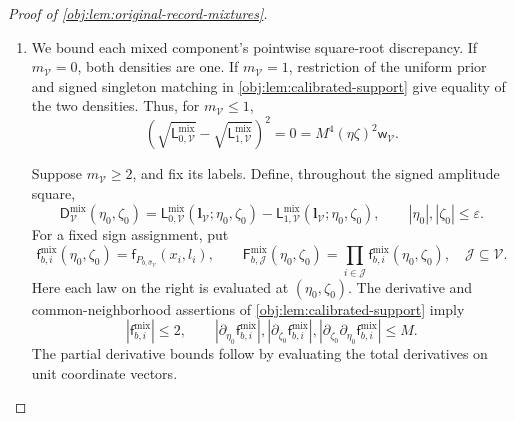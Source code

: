 \begin{proof}[Proof of \cref{obj:lem:original-record-mixtures}]
\begin{enumerate}
Define the conditional discrepancy by
\[
\mathsf h_{\mathrm{mix}}(\mathbf x)
=
\int_{\mathscr L^{\mathcal I_n}}
\left(
\sqrt{\mathsf L_0^{\mathrm{mix}}(\mathbf x,\boldsymbol l;\eta,\zeta)}
-\sqrt{\mathsf L_1^{\mathrm{mix}}(\mathbf x,\boldsymbol l;\eta,\zeta)}
\right)^2\,d\tau^{\otimes n}(\boldsymbol l).
\]
Since each label vector has reference mass \(4^{-n}\), scaling the
densities by \(4^{-n}\) turns this integral exactly into the squared
root discrepancy of the corresponding label masses. The affinity
calculation therefore proves
\[
\mathsf h_{\mathrm{mix}}(\mathbf x)
\le
\sum_{\mathcal V\in\mathscr B_{\mathbf x}}
4^{-m_{\mathcal V}}
\sum_{\boldsymbol l_{\mathcal V}\in\mathscr L^{\mathcal V}}
\left(
\sqrt{\mathsf L_{0,\mathcal V}^{\mathrm{mix}}}
-\sqrt{\mathsf L_{1,\mathcal V}^{\mathrm{mix}}}
\right)^2.
\]
Finally, the common uniform covariate marginal and the displayed
product densities give, by integration over covariates and labels,
\[
\mathcal H^2(Q_0,Q_1)
=\int\mathsf h_{\mathrm{mix}}(\mathbf x)\,
d\lambda^{\otimes n}(\mathbf x).
\]

\item We bound each mixed component's pointwise square-root discrepancy.
If \(m_{\mathcal V}=0\), both densities are one. If
\(m_{\mathcal V}=1\), restriction of the uniform prior and signed
singleton matching in \cref{obj:lem:calibrated-support} give equality
of the two densities. Thus, for \(m_{\mathcal V}\le1\),
\[
\left(
\sqrt{\mathsf L_{0,\mathcal V}^{\mathrm{mix}}}
-\sqrt{\mathsf L_{1,\mathcal V}^{\mathrm{mix}}}
\right)^2=0=M^4(\eta\zeta)^2\mathsf w_{\mathcal V}.
\]

Suppose \(m_{\mathcal V}\ge2\), and fix its labels. Define, throughout
the signed amplitude square,
\[
\mathsf D_{\mathcal V}^{\mathrm{mix}}(\eta_0,\zeta_0)
=
\mathsf L_{0,\mathcal V}^{\mathrm{mix}}
(\boldsymbol l_{\mathcal V};\eta_0,\zeta_0)
-
\mathsf L_{1,\mathcal V}^{\mathrm{mix}}
(\boldsymbol l_{\mathcal V};\eta_0,\zeta_0),
\qquad
|\eta_0|,|\zeta_0|\le\varepsilon.
\]
For a fixed sign assignment, put
\[
\mathsf f_{b,i}^{\mathrm{mix}}(\eta_0,\zeta_0)
=\mathsf f_{P_{b,\widehat\sigma_{\mathcal V}}}(x_i,l_i),
\qquad
\mathsf F_{b,\mathcal J}^{\mathrm{mix}}(\eta_0,\zeta_0)
=\prod_{i\in\mathcal J}\mathsf f_{b,i}^{\mathrm{mix}}(\eta_0,\zeta_0),
\quad \mathcal J\subseteq\mathcal V.
\]
Here each law on the right is evaluated at \((\eta_0,\zeta_0)\).
The derivative and common-neighborhood assertions of
\cref{obj:lem:calibrated-support} imply
\[
|\mathsf f_{b,i}^{\mathrm{mix}}|\le2,\qquad
|\partial_{\eta_0}\mathsf f_{b,i}^{\mathrm{mix}}|,
|\partial_{\zeta_0}\mathsf f_{b,i}^{\mathrm{mix}}|,
|\partial_{\zeta_0}\partial_{\eta_0}\mathsf f_{b,i}^{\mathrm{mix}}|
\le M.
\]
The partial derivative bounds follow by evaluating the total
derivatives on unit coordinate vectors.


\end{enumerate}
\end{proof}
